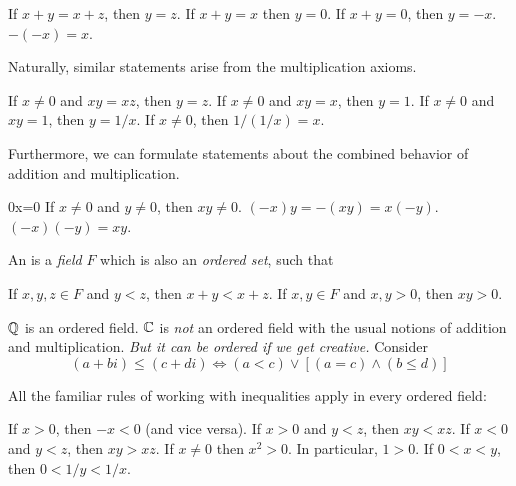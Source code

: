 \documentclass{article}
\begin{document}
\begin{proposition}
    \listhack
    \begin{enumerate}
        \ii If $x+y=x+z$, then $y=z$.
        \ii If $x+y=x$ then $y=0$.
        \ii If $x+y=0$, then $y=-x$.
        \ii $-(-x)=x$.
    \end{enumerate}
\end{proposition}
Naturally, similar statements arise from the multiplication axioms.
\begin{proposition}
    \listhack 
    \begin{enumerate}
        \ii If $x\neq 0$ and $xy=xz$, then $y=z$.
        \ii If $x\neq 0$ and $xy=x$, then $y=1$.
        \ii If $x\neq 0$ and $xy=1$, then $y=1/x$.
        \ii If $x\neq 0$, then $1/(1/x)=x$.
    \end{enumerate}
\end{proposition}

Furthermore, we can formulate statements about the combined behavior of addition and multiplication.
\begin{proposition}
    \listhack 
    \begin{enumerate}
        \ii 0x=0
        \ii If $x\neq 0$ and $y\neq 0$, then $xy\neq 0$.
        \ii $(-x)y=-(xy)=x(-y)$.
        \ii $(-x)(-y)=xy$.
    \end{enumerate}
\end{proposition}

\begin{definition}
    An  is a \emph{field} $F$ which is also an \emph{ordered set}, such that 
    \begin{enumerate}
        \ii If $x,y,z\in F$ and $y<z$, then $x+y<x+z$.
        \ii If $x,y\in F$ and $x,y>0$, then $xy>0$.
    \end{enumerate}
\end{definition}
\begin{example}
    \listhack 
    \begin{enumerate}
        \ii $\mathbb Q$ is an ordered field.
        \ii $\mathbb C$ is \textit{not} an ordered field with the usual notions of addition and multiplication. \textit{But it can be ordered if we get creative.} Consider \[(a+bi)\leq (c+di)\iff (a<c)\vee [(a=c)\wedge (b\leq d)]\]
    \end{enumerate}
\end{example}   
All the familiar rules of working with inequalities apply in every ordered field: 
\begin{proposition}
    \listhack 
    \begin{enumerate}
        \ii If $x>0$, then $-x<0$ (and vice versa).
        \ii If $x>0$ and $y<z$, then $xy<xz$.
        \ii If $x<0$ and $y<z$, then $xy>xz$.
        \ii If $x\neq 0$ then $x^{2}>0$. In particular, $1>0$.
        \ii If $0<x<y$, then $0<1/y<1/x$.
    \end{enumerate}
\end{proposition}
\end{document}
